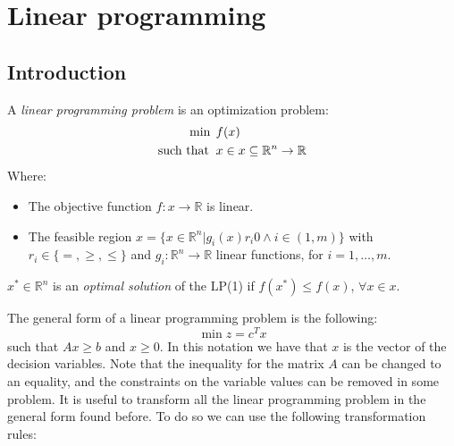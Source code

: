 \documentclass[12pt, a4paper]{report}
\begin{document}
    \newpage 

    \chapter{Linear programming}
    \section{Introduction}
    \begin{definition}
        A \emph{linear programming problem} is an optimization problem: 
        \begin{align*}
            \min                      \:&\:f(x)           \\
            \textnormal{such that }     &\: x \in x \subseteq \mathbb{R}^n \rightarrow \mathbb{R} 
        \end{align*}
        Where: 
        \begin{itemize}
            \item The objective function $f:x \rightarrow \mathbb{R}$ is linear. 
            \item The feasible region $x=\{x \in \mathbb{R}^n|g_i(x)r_i0 \land i \in (1,m)\}$ with $r_i \in \{=,\geq,\leq\}$ and 
            $g_i:\mathbb{R}^n \rightarrow \mathbb{R}$ linear functions, for $i=1,\dots,m$.
        \end{itemize}
    
        $x^{*} \in \mathbb{R}^n$ is an \emph{optimal solution} of the LP(1) if $f(x^{*}) \leq f(x)$, $\forall x \in x$. 
    \end{definition}
    The general form of a linear programming problem is the following: 
    \[\min{z}=c^Tx\]
    such that $Ax \geq b$ and $x \geq 0$. In this notation we have that $x$
    is the vector of the decision variables. Note that the inequality for the matrix $A$ can be changed to an equality, and the 
    constraints on the variable values can be removed in some problem. It is useful to transform all the linear programming problem in the 
    general form found before. To do so we can use the following transformation rules: 
\end{document}
